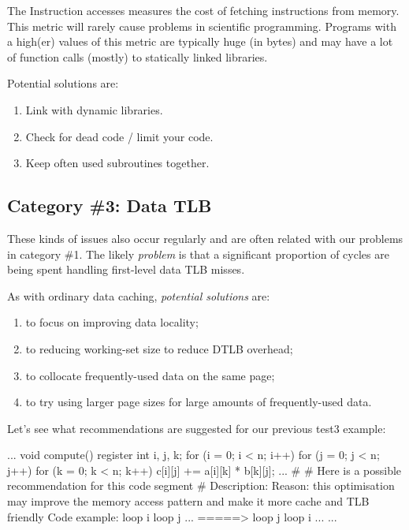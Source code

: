 The Instruction accesses measures the cost of fetching instructions from memory. This metric will rarely cause problems in scientific programming. Programs with a high(er) values of this metric are typically huge (in bytes) and may have a lot of function calls (mostly) to statically linked libraries.

Potential solutions are:

\begin{enumerate}
  \item  Link with dynamic libraries.
  \item  Check for dead code / limit your code.
  \item  Keep often used subroutines together.
\end{enumerate}

\subsection{Category \#3: Data TLB}
\label{ch03:subsec:CAT3_Data_TLB}

These kinds of issues also occur regularly and are often related with our problems in category \#1. The likely \emph{problem} is that a significant proportion of cycles are being spent handling first-level data TLB misses.

As with ordinary data caching, \emph{potential solutions} are:

\begin{enumerate}
  \item  to focus on improving data locality;
  \item  to reducing working-set size to reduce DTLB overhead;
  \item  to collocate frequently-used data on the same page;
  \item  to try using larger page sizes for large amounts of frequently-used data.
\end{enumerate}

Let's see what recommendations are suggested for our previous test3 example:

\begin{prompt}
...
void compute()
{
register int i, j, k;
for (i = 0; i < n; i++)
  for (j = 0; j < n; j++)
    for (k = 0; k < n; k++)
      c[i][j] += a[i][k] * b[k][j];
}
...
\#
\# Here is a possible recommendation for this code segment
\#
Description: %
Reason: this optimisation may improve the memory access pattern and make it more cache and TLB friendly
Code example:
loop i {
  loop j {...}
}
=====>
loop j {
  loop i {...}
}
...
\end{prompt}

